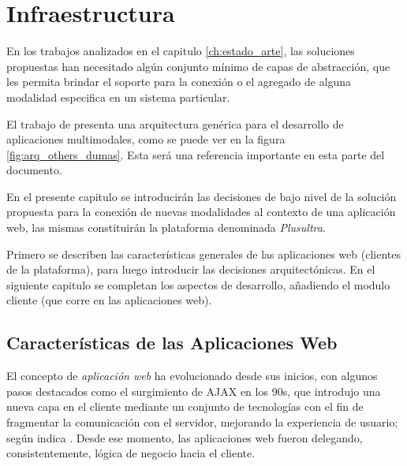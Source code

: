 
\chapter{Infraestructura} %

\label{ch:infra} 



En los trabajos analizados en el capitulo \ref{ch:estado_arte}, las soluciones propuestas han necesitado algún conjunto mínimo de capas de abstracción, que les permita brindar el soporte para la conexión o el agregado de alguna modalidad especifica en un sistema particular.

El trabajo de \citet{dumas2009multimodal} presenta una arquitectura genérica para el desarrollo de aplicaciones multimodales, como se puede ver en la figura \ref{fig:arq_others_dumas}. Esta será una referencia importante en esta parte del documento.

En el presente capitulo se introducirán las decisiones de bajo nivel de la solución propuesta para la conexión de nuevas modalidades al contexto de una aplicación web, las mismas constituirán la plataforma denominada \emph{Plusultra}. 

Primero se describen las características generales de las aplicaciones web (clientes de la plataforma), para luego introducir las decisiones arquitectónicas. En el siguiente capitulo se completan los aspectos de desarrollo, añadiendo el modulo cliente (que corre en las aplicaciones web).

\section{Características de las Aplicaciones Web} \label{sec:web_app_def}

El concepto de \emph{aplicación web} ha evolucionado desde sus inicios, con algunos pasos destacados como el surgimiento de AJAX en los 90s, que introdujo una nueva capa en el cliente mediante un conjunto de tecnologías con el fin de fragmentar la comunicación con el servidor, mejorando la experiencia de usuario; según indica \citet{garrett2005ajax}. Desde ese momento, las aplicaciones web fueron delegando, consistentemente, lógica de negocio hacia el cliente. 

